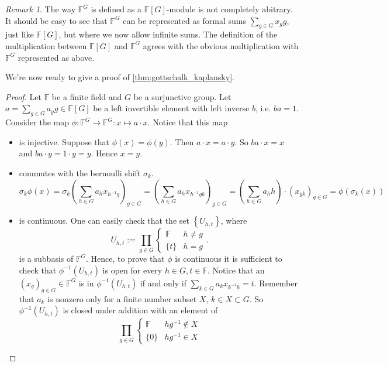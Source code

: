 \documentclass[titlepage, a4paper]{article}
\newcommand{\F}{\mathbb{F}}
\theoremstyle{remark}
\newtheorem{remark}[theorem]{Remark}
\begin{document}
        \begin{remark}
        The way $\F^{G}$ is defined as a $\F[G]$-module is not completely abitrary. It should be easy to see that  $\F^{G}$ can be represented as formal sums $\sum_{g \in G} x_g g$, just like $\F[G]$, but where we now allow infinite sums. 
        The definition of the multiplication between  $\F[G]$ and  $\F^{G}$ agrees with the obvious multiplication with $\F^{G}$ represented as above. 
    \end{remark}
    
	We're now ready to give a proof of \cref{thm:gottschalk_kaplansky}.
	\begin{proof}
		Let $\F$ be a finite field and $G$ be a surjunctive group. 
		Let $a = \sum_{g \in G} a_g g \in \F[G]$ be a left invertible element with left inverse $b$, i.e.  $b a = 1$. 
		Consider the map $\phi: \F^{G} \to \F^{G}: x \mapsto a\cdot x$. Notice that this map 
		\begin{itemize}
			\item is injective. Suppose that $\phi(x) = \phi(y)$. Then $a\cdot x = a\cdot y$. So $ba\cdot x  = x$ and $ba \cdot y = 1\cdot y = y$. Hence $x = y$.
			\item commutes with the bernoulli shift  $\sigma_k$. 
				 \[
					 \sigma_k \phi(x) 
					 = \sigma_k\left( \sum_{h \in G} a_h x_{h^{-1}g} \right)_{g \in G} 
					 = \left( \sum_{h \in G} a_h x_{h^{-1}gk} \right)_{g \in G} 
					 = \left( \sum_{h \in G}a_h h \right) \cdot (x_{gk})_{g \in G} = \phi(\sigma_k(x)) 
				\]
			\item is continuous. 
			One can easily check that the set $\left\{ U_{h, t} \right\}$, where \[
			U_{h,t}:= \prod_{g \in G} \begin{cases}
				\F & h \ne g\\
				\{t\}& h = g
			\end{cases}
			.\] 
			is a subbasis of $\F^{G}$. 
			Hence, to prove that $\phi$ is continuous it is sufficient to check that $\phi^{-1}(U_{h, t})$ is open for every $h \in G, t\in \F$.
			Notice that an  $(x_g)_{g \in G} \in \F^{G}$ is in $\phi^{-1}(U_{h,t})$ if and only if $\sum_{k \in G} a_k x_{k^{-1}h} = t$. 
			Remember that $a_k$ is nonzero only for a finite number subset $X$,  $k\in X \subset G$. 	
			So $\phi^{-1}(U_{h, t})$ is closed under addition with an element of  \[
			\prod_{g \in G} \begin{cases}
				\F & hg^{-1}  \not\in X\\
				\{0\} & hg^{-1} \in X 
			\end{cases}
\]
\end{itemize}
\end{proof}
\end{document}
